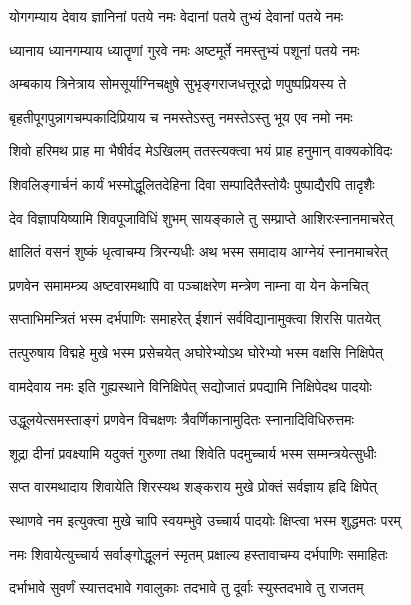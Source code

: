 \twolineshloka
{योगगम्याय देवाय ज्ञानिनां पतये नमः}
{वेदानां पतये तुभ्यं देवानां पतये नमः}%

\twolineshloka
{ध्यानाय ध्यानगम्याय ध्यातॄणां गुरवे नमः}
{अष्टमूर्ते नमस्तुभ्यं पशूनां पतये नमः}%

\twolineshloka
{अम्बकाय त्रिनेत्राय सोमसूर्याग्निचक्षुषे}
{सुभृङ्गराजधत्तूरद्रो णपुष्पप्रियस्य ते}%

\twolineshloka
{बृहतीपूगपुन्नागचम्पकादिप्रियाय च}
{नमस्तेऽस्तु नमस्तेऽस्तु भूय एव नमो नमः}%

\twolineshloka
{शिवो हरिमथ प्राह मा भैषीर्वद मेऽखिलम्}
{ततस्त्यक्त्वा भयं प्राह हनुमान् वाक्यकोविदः}%

\twolineshloka
{शिवलिङ्गार्चनं कार्यं भस्मोद्धूलितदेहिना}
{दिवा सम्पादितैस्तोयैः पुष्पाद्यैरपि तादृशैः}%

\twolineshloka
{देव विज्ञापयिष्यामि शिवपूजाविधिं शुभम्}
{सायङ्काले तु सम्प्राप्ते आशिरःस्नानमाचरेत्}%

\twolineshloka
{क्षालितं वसनं शुष्कं धृत्वाचम्य त्रिरन्यधीः}
{अथ भस्म समादाय आग्नेयं स्नानमाचरेत्}%

\twolineshloka
{प्रणवेन समामम्त्र्य अष्टवारमथापि वा}
{पञ्चाक्षरेण मन्त्रेण नाम्ना वा येन केनचित्}%

\twolineshloka
{सप्ताभिमन्त्रितं भस्म दर्भपाणिः समाहरेत्}
{ईशानं सर्वविद्यानामुक्त्वा शिरसि पातयेत्}%

\twolineshloka
{तत्पुरुषाय विद्महे मुखे भस्म प्रसेचयेत्}
{अघोरेभ्योऽथ घोरेभ्यो भस्म वक्षसि निक्षिपेत्}%

\twolineshloka
{वामदेवाय नमः इति गुह्यस्थाने विनिक्षिपेत्}
{सद्योजातं प्रपद्यामि निक्षिपेदथ पादयोः}%

\twolineshloka
{उद्धूलयेत्समस्ताङ्गं प्रणवेन विचक्षणः}
{त्रैवर्णिकानामुदितः स्नानादिविधिरुत्तमः}%

\twolineshloka
{शूद्रा दीनां प्रवक्ष्यामि यदुक्तं गुरुणा तथा}
{शिवेति पदमुच्चार्य भस्म सम्मन्त्रयेत्सुधीः}%

\twolineshloka
{सप्त वारमथादाय शिवायेति शिरस्यथ}
{शङ्कराय मुखे प्रोक्तं सर्वज्ञाय हृदि क्षिपेत्}%

\twolineshloka
{स्थाणवे नम इत्युक्त्वा मुखे चापि स्वयम्भुवे}
{उच्चार्य पादयोः क्षिप्त्वा भस्म शुद्धमतः परम्}%

\twolineshloka
{नमः शिवायेत्युच्चार्य सर्वाङ्गोद्धूलनं स्मृतम्}
{प्रक्षाल्य हस्तावाचम्य दर्भपाणिः समाहितः}%

\twolineshloka
{दर्भाभावे सुवर्णं स्यात्तदभावे गवालुकाः}
{तदभावे तु दूर्वाः स्युस्तदभावे तु राजतम्}%

